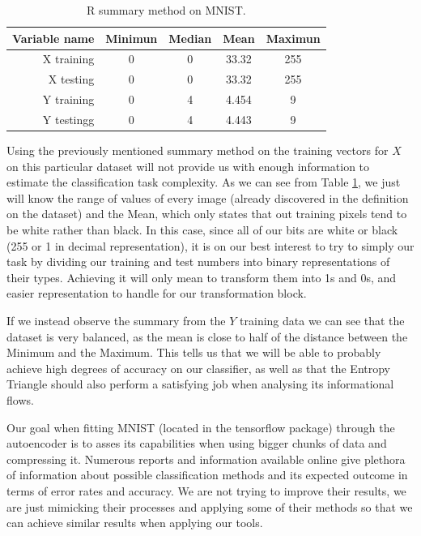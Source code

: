 \begin{table}[H]
	\caption{R summary method on MNIST.}
	\begin{center}
		\label{tab:table_MNIST}
		\begin{tabular}{r|c|c|c|c} %
			\textbf{Variable name} & \textbf{Minimun} & \textbf{Median} & \textbf{Mean} & \textbf{Maximun}\\
			\hline
			X training & 0 & 0 & 33.32 & 255 \\
			X testing  & 0 & 0 & 33.32 & 255 \\
		    Y training & 0 & 4 & 4.454 & 9 \\
		    Y testingg & 0 & 4 & 4.443 & 9 \\
		\end{tabular}
	\end{center}
\end{table}

Using the previously mentioned summary method on the training vectors for $X$ on this particular dataset will not provide us with enough information to estimate the classification task complexity. As we can see from Table \ref{tab:table_MNIST}, we just will know the range of values of every image (already discovered in the definition on the dataset) and the Mean, which only states that out training pixels tend to be white rather than black. In this case, since all of our bits are white or black (255 or 1 in decimal representation), it is on our best interest to try to simply our task by dividing our training and test numbers into binary representations of their types. Achieving it will only mean to transform them into 1s and 0s, and easier representation to handle for our transformation block. \par 

If we instead observe the summary from the $Y$ training data we can see that the dataset is very balanced, as the mean is close to half of the distance between the Minimum and the Maximum. This tells us that we will be able to probably achieve high degrees of accuracy on our classifier, as well as that the Entropy Triangle should also perform a satisfying job when analysing its informational flows.  \par

Our goal when fitting MNIST (located in the tensorflow package) through the autoencoder is to asses its capabilities when using bigger chunks of data and compressing it. Numerous reports and information available online give plethora of information about possible classification methods and its expected outcome in terms of error rates and accuracy. We are not trying to improve their results, we are just mimicking their processes and applying some of their methods so that we can achieve similar results when applying our tools.\par


